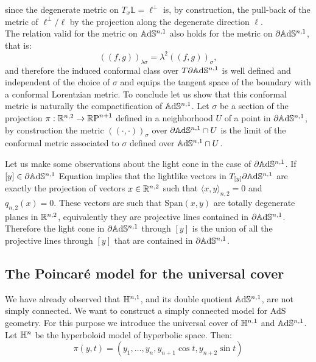 since the degenerate metric on $T_x\mathbb{L}=\ell^\perp$ is, by construction, the pull-back of the metric of $\ell^{\perp}/\ell$ by the projection along the degenerate direction $\ell$.\\ 
The relation valid for the metric on $\mathbb{A}\mathrm{d}\mathbb{S}^{n,1}$ also holds for the metric on $\partial\mathbb{A}\mathrm{d}\mathbb{S}^{n,1}$, that is: 
\begin{equation}\label{26}
    ((f,g))_{\lambda\sigma}=\lambda^2((f,g))_{\sigma},
\end{equation} 
and therefore the induced conformal class over $T\partial\mathbb{A}\mathrm{d}\mathbb{S}^{n,1}$ is well defined and independent of the choice of $\sigma$ and equips the tangent space of the boundary with a conformal Lorentzian metric. To conclude let us show that this conformal metric is naturally the compactification of $\mathbb{A}\mathrm{d}\mathbb{S}^{n,1}$. Let $\sigma$ be a section of the projection $\pi:\mathbb{R}^{n,2}\to \mathbb{R}\text{P}^{n+1}$ defined in a neighborhood $U$ of a point in $\partial\mathbb{A}\mathrm{d}\mathbb{S}^{n,1}$, by construction the metric $((\cdot,\cdot))_\sigma$ over $\partial\mathbb{A}\mathrm{d}\mathbb{S}^{n,1}\cap U$ is the limit of the conformal metric associated to $\sigma$ defined over $\mathbb{A}\mathrm{d}\mathbb{S}^{n,1}\cap U$. %
\begin{observation}\label{222}
Let us make some observations about the light cone in the case of $\partial\mathbb{A}\mathrm{d}\mathbb{S}^{n,1}$. If $[y]\in\partial\mathbb{A}\mathrm{d}\mathbb{S}^{n,1}$ Equation  implies that the lightlike vectors in $T_{[y]}\partial\mathbb{A}\mathrm{d}\mathbb{S}^{n,1}$ are exactly the projection of vectors $x\in \mathbb{R}^{n,2}$ such that $\langle x,y\rangle_{n,2}=0$ and $q_{n,2}(x)=0$. These vectors are such that $\text{Span}(x,y)$ are totally degenerate planes in $\mathbb{R}^{n,2}$, equivalently they are projective lines contained in $\partial\mathbb{A}\mathrm{d}\mathbb{S}^{n,1}$. Therefore the light cone in $\partial\mathbb{A}\mathrm{d}\mathbb{S}^{n,1}$ through $[y]$ is the union of all the projective lines through $[y]$ that are contained in $\partial\mathbb{A}\mathrm{d}\mathbb{S}^{n,1}$.

\end{observation}


\subsection{The Poincaré model for the universal cover}
We have already observed that $\mathbb{H}^{n,1}$, and its double quotient $\mathbb{A}\mathrm{d}\mathbb{S}^{n,1}$, are not simply connected. We want to construct a simply connected model for AdS geometry. For this purpose we introduce the universal cover of $\mathbb{H}^{n,1}$ and $\mathbb{A}\mathrm{d}\mathbb{S}^{n,1}$.\\
Let $\mathbb{H}^n$ be the hyperboloid model of hyperbolic space. Then: 
\begin{equation}\label{ogcover}
    \pi(y,t)=(y_1,\dots,y_n,y_{n+1}\cos t,y_{n+2}\sin t)
\end{equation}


